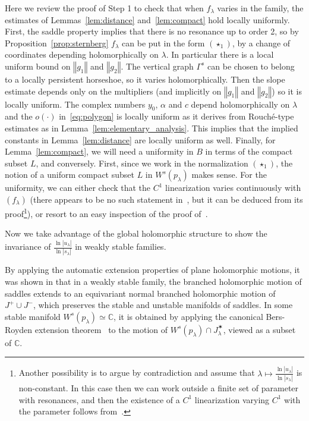 \documentclass[11pt, oneside]{amsart}
\newcommand{\C}{\mathbb{C}}
\newcommand{\norm}[1]{\left\Vert#1\right\Vert}
\newcommand{\abs}[1]{\left\vert#1\right\vert}
\newcommand{\la}{\lambda}
\newcommand{\jstar}{J^\varstar}
\theoremstyle{remark}
\theoremstyle{definition}
\theoremstyle{theorem}
\begin{document}
Here we review the proof of Step 1 to check that when $f_\lambda$ varies in the family, the estimates of 
Lemmas~\ref{lem:distance} and~\ref{lem:compact} hold locally uniformly. First, the saddle property implies that there is no resonance up to order 2, so by Proposition~\ref{prop:sternberg}
 $f_\lambda$ can be put in the form $(\star_1)$, by a change of coordinates depending holomorphically on $\lambda$. In particular  there is a local uniform bound on  $\norm{g_1}$ and $\norm{g_2}$. 
The vertical graph $\Gamma^s$ can be chosen to belong to a locally persistent horseshoe, so it varies holomorphically. Then the slope estimate depends only on the multipliers (and implicitly on $\norm{g_1}$ and $\norm{g_2}$) so it is locally uniform. The complex numbers 
 $y_0$, $\alpha$ and $c$ depend holomorphically on $\lambda$ and the $o(\cdot)$ in~\eqref{eq:polygon} is locally uniform as it derives from Rouché-type estimates as in Lemma~\ref{lem:elementary_analysis}. This implies that the implied constants in 
Lemma~\ref{lem:distance} are locally uniform as well. Finally, for Lemma~\ref{lem:compact}, we will need a uniformity in $B$ in terms of the compact subset  $L$, and conversely. First, since we work in the normalization  $(\star_1)$, the notion of a uniform compact subset $L$ in $W^s(p_\lambda)$ makes sense. For the uniformity, we can either check that the $C^1$ linearization varies continuously with $(f_\lambda)$ (there appears to be no such statement in~\cite{hartman}, but it can be deduced from its proof\footnote{Another possibility is to argue  by contradiction and    assume that $\lambda \mapsto \frac{\ln \abs{u_\lambda}}{\ln \abs{s_\lambda}}$ is non-constant. 
In this case then we can work outside a finite set of parameter with resonances, and then the existence of a $C^1$ linearization varying $C^1$ with the parameter follows from~\cite[Thm 9]{sell}.}), or resort to an easy inspection of  the proof of~\cite[Lem. 4.2]{df:DMM}.  





 Now we take advantage of the global holomorphic structure to show  
 the invariance of $\frac{\ln{\abs{u_\lambda}}}{\ln\abs{s_\lambda}} $ in   weakly stable families. 
 
By applying the automatic extension properties of plane holomorphic motions, it 
was shown in \cite[Thm 5.12 and Cor. 5.14]{tangencies} that in a   weakly stable family, the branched 
holomorphic motion of saddles extends to an equivariant normal branched holomorphic motion of $J^+
\cup J^-$, which preserves the stable and unstable manifolds of saddles. 
In some stable manifold $W^s(p_\lambda)\simeq \C$, it is  obtained by 
applying the canonical Bers-Royden  extension theorem~\cite{bers-royden}
 to the motion of $W^s(p_\lambda)\cap \jstar_\la$, viewed as a subset of $\C$.
\end{document}
